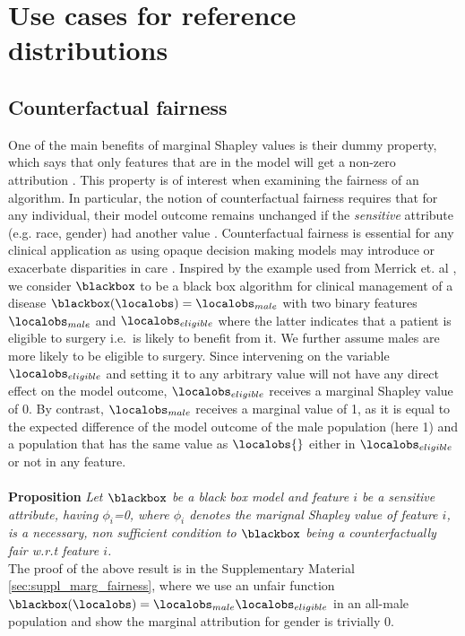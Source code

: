 \documentclass[nohyperref]{article}
\theoremstyle{plain}
\theoremstyle{definition}
\theoremstyle{remark}
\begin{document}
\section{Use cases for reference distributions}
\label{sec:use_cases}

\subsection{Counterfactual fairness}

One of the main benefits of marginal Shapley values is their dummy property, which says that only features that are in the model will get a non-zero attribution \cite{janzing2020feature, sundararajan2020many}. This property is of interest when examining the fairness of an algorithm. In particular, the notion of counterfactual fairness requires that for any individual, their model outcome remains unchanged if the \emph{sensitive} attribute (e.g. race, gender) had another value \cite{kusner2017counterfactual}.  
Counterfactual fairness is essential for any clinical application as using opaque decision making models may introduce or exacerbate disparities in care \cite{ahmad2020fairness}. Inspired by the example used from Merrick et. al , we consider $\blackbox$ to be a black box algorithm for clinical management of a disease $\blackbox(\localobs)=\localobs_{male}$ with two binary features $\localobs_{male}$ and $\localobs_{eligible}$ where the latter indicates that a patient is eligible to surgery i.e.\ is likely to benefit from it. We further assume males are more likely to be eligible to surgery. Since intervening on the variable $\localobs_{eligible}$ and setting it to any arbitrary value will not have any direct effect on the model outcome, $\localobs_{eligible}$ receives a marginal Shapley value of 0. By contrast, $\localobs_{male}$ receives a marginal value of 1, as it is equal to the expected difference of the model outcome of the male population (here 1) and a population that has the same value as $\localobs{}$ either in $\localobs_{eligible}$ or not in any feature. \\
\\
\textbf{Proposition} \textit{Let $\blackbox$ be a black box model and feature $i$ be a sensitive attribute, having $\phi_i$=0, where $\phi_i$ denotes the marignal Shapley value of feature $i$, is a necessary, non sufficient condition to $\blackbox$ being a counterfactually fair w.r.t feature $i$.} 
\\
The proof of the above result is in the Supplementary Material \ref{sec:suppl_marg_fairness}, where we use an unfair function $\blackbox(\localobs)=\localobs_{male}\localobs_{eligible}$ in an all-male population and show the marginal attribution for gender is trivially 0. 
\end{document}
